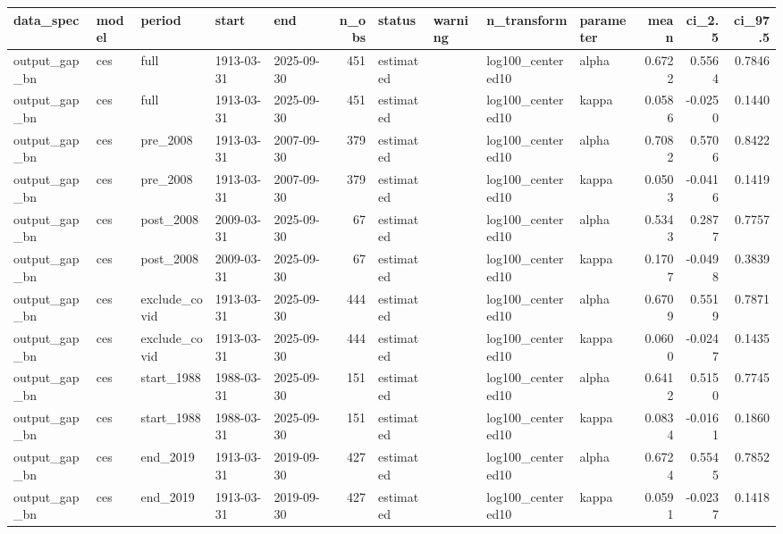 \begin{tabular}{lllllrllllrrr}
\toprule
data\_spec & model & period & start & end & n\_obs & status & warning & n\_transform & parameter & mean & ci\_2.5 & ci\_97.5 \\
\midrule
output\_gap\_bn & ces & full & 1913-03-31 & 2025-09-30 & 451 & estimated &  & log100\_centered10 & alpha & 0.6722 & 0.5564 & 0.7846 \\
output\_gap\_bn & ces & full & 1913-03-31 & 2025-09-30 & 451 & estimated &  & log100\_centered10 & kappa & 0.0586 & -0.0250 & 0.1440 \\
output\_gap\_bn & ces & pre\_2008 & 1913-03-31 & 2007-09-30 & 379 & estimated &  & log100\_centered10 & alpha & 0.7082 & 0.5706 & 0.8422 \\
output\_gap\_bn & ces & pre\_2008 & 1913-03-31 & 2007-09-30 & 379 & estimated &  & log100\_centered10 & kappa & 0.0503 & -0.0416 & 0.1419 \\
output\_gap\_bn & ces & post\_2008 & 2009-03-31 & 2025-09-30 & 67 & estimated &  & log100\_centered10 & alpha & 0.5343 & 0.2877 & 0.7757 \\
output\_gap\_bn & ces & post\_2008 & 2009-03-31 & 2025-09-30 & 67 & estimated &  & log100\_centered10 & kappa & 0.1707 & -0.0498 & 0.3839 \\
output\_gap\_bn & ces & exclude\_covid & 1913-03-31 & 2025-09-30 & 444 & estimated &  & log100\_centered10 & alpha & 0.6709 & 0.5519 & 0.7871 \\
output\_gap\_bn & ces & exclude\_covid & 1913-03-31 & 2025-09-30 & 444 & estimated &  & log100\_centered10 & kappa & 0.0600 & -0.0247 & 0.1435 \\
output\_gap\_bn & ces & start\_1988 & 1988-03-31 & 2025-09-30 & 151 & estimated &  & log100\_centered10 & alpha & 0.6412 & 0.5150 & 0.7745 \\
output\_gap\_bn & ces & start\_1988 & 1988-03-31 & 2025-09-30 & 151 & estimated &  & log100\_centered10 & kappa & 0.0834 & -0.0161 & 0.1860 \\
output\_gap\_bn & ces & end\_2019 & 1913-03-31 & 2019-09-30 & 427 & estimated &  & log100\_centered10 & alpha & 0.6724 & 0.5545 & 0.7852 \\
output\_gap\_bn & ces & end\_2019 & 1913-03-31 & 2019-09-30 & 427 & estimated &  & log100\_centered10 & kappa & 0.0591 & -0.0237 & 0.1418 \\
\bottomrule
\end{tabular}
